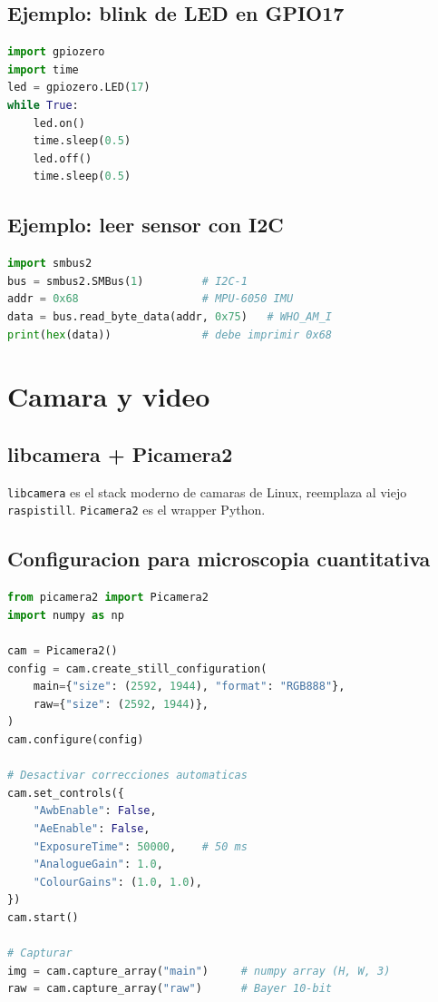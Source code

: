 \documentclass[11pt,a4paper,oneside]{report}
\begin{document}
\section{Ejemplo: blink de LED en GPIO17}

\begin{lstlisting}[language=python]
import gpiozero
import time
led = gpiozero.LED(17)
while True:
    led.on()
    time.sleep(0.5)
    led.off()
    time.sleep(0.5)
\end{lstlisting}

\section{Ejemplo: leer sensor con I2C}

\begin{lstlisting}[language=python]
import smbus2
bus = smbus2.SMBus(1)         # I2C-1
addr = 0x68                   # MPU-6050 IMU
data = bus.read_byte_data(addr, 0x75)   # WHO_AM_I
print(hex(data))              # debe imprimir 0x68
\end{lstlisting}

\chapter{Camara y video}

\section{libcamera + Picamera2}

\texttt{libcamera} es el stack moderno de camaras de Linux, reemplaza al viejo
\texttt{raspistill}. \texttt{Picamera2} es el wrapper Python.

\section{Configuracion para microscopia cuantitativa}

\begin{lstlisting}[language=python]
from picamera2 import Picamera2
import numpy as np

cam = Picamera2()
config = cam.create_still_configuration(
    main={"size": (2592, 1944), "format": "RGB888"},
    raw={"size": (2592, 1944)},
)
cam.configure(config)

# Desactivar correcciones automaticas
cam.set_controls({
    "AwbEnable": False,
    "AeEnable": False,
    "ExposureTime": 50000,    # 50 ms
    "AnalogueGain": 1.0,
    "ColourGains": (1.0, 1.0),
})
cam.start()

# Capturar
img = cam.capture_array("main")     # numpy array (H, W, 3)
raw = cam.capture_array("raw")      # Bayer 10-bit
\end{lstlisting}
\end{document}
